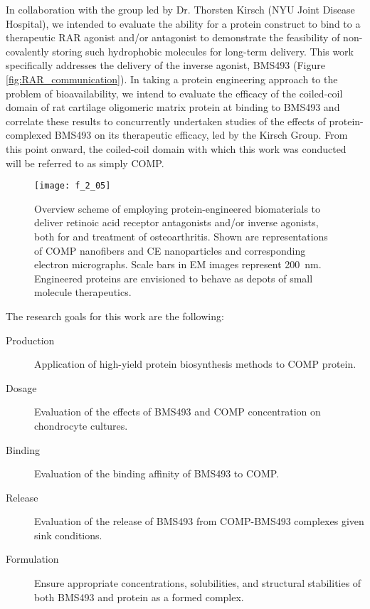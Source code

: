 \begin{refsection}
In collaboration with the group led by Dr. Thorsten Kirsch (NYU Joint Disease
Hospital), we intended to evaluate the ability for a protein construct to bind
to a therapeutic RAR agonist and/or antagonist to demonstrate the feasibility of
non-covalently storing such hydrophobic molecules for long-term delivery. This
work specifically addresses the delivery of the inverse agonist, BMS493 (Figure
\ref{fig:RAR_communication}). In taking a protein engineering approach to the
problem of bioavailability, we intend to evaluate the efficacy of the
coiled-coil domain of rat cartilage oligomeric matrix protein at binding to
BMS493 and correlate these results to concurrently undertaken 
studies of the effects of protein-complexed BMS493 on its therapeutic efficacy,
led by the Kirsch Group. From this point onward, the coiled-coil domain with
which this work was conducted will be referred to as simply COMP.
\begin{figure}[h!] \centering \texttt{[image: f\_2\_05]}
    \caption{Overview scheme of employing protein-engineered biomaterials to
        deliver retinoic acid receptor antagonists and/or inverse agonists, both
        for  and  treatment of osteoarthritis.
        Shown are representations of COMP nanofibers and CE nanoparticles and
        corresponding electron micrographs. Scale bars in EM images represent
        \SI{200}{\nm}. Engineered proteins are envisioned to behave as depots of
    small molecule therapeutics.}\label{fig:research_intention} \end{figure}
The research goals for this work are the following:
\begin{description}
    \item[Production] Application of high-yield protein biosynthesis methods to
        COMP protein.
    \item[Dosage] Evaluation of the effects of BMS493 and COMP concentration on
         chondrocyte cultures.
    \item[Binding] Evaluation of the binding affinity of BMS493 to COMP.
    \item[Release] Evaluation of the release of BMS493 from COMP-BMS493
        complexes given sink conditions.
    \item[Formulation] Ensure appropriate concentrations, solubilities, and
        structural stabilities of both BMS493 and protein as a formed complex.

\end{description}
\end{refsection}
